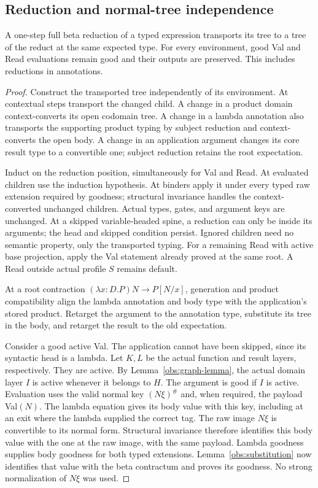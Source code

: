 \subsection{Reduction and normal-tree independence}
\label{obs:reduction}

\begin{lemma}\label{obs:reduction-transport}
A one-step full beta reduction of a typed expression transports its
tree to a tree of the reduct at the same expected type.  For every
environment, good Val and Read evaluations remain good and their
outputs are preserved.  This includes reductions in annotations.
\end{lemma}
\begin{proof}
Construct the transported tree independently of its environment.  At
contextual steps transport the changed child.  A change in a product
domain context-converts its open codomain tree.  A change in a lambda
annotation also transports the supporting product typing by subject
reduction and context-converts the open body.  A change in an
application argument changes its core result type to a convertible
one; subject reduction retains the root expectation.

Induct on the reduction position, simultaneously for Val and Read.
At evaluated children use the induction hypothesis.  At binders apply
it under every typed raw extension required by goodness; structural
invariance handles the context-converted unchanged children.  Actual
types, gates, and argument keys are unchanged.  At a skipped
variable-headed spine, a reduction can only be inside its arguments;
the head and skipped condition persist.  Ignored children need no
semantic property, only the transported typing.  For a remaining Read
with active base projection, apply the Val statement already proved
at the same root.  A Read outside actual profile $S$ remains default.

At a root contraction $(\lambda x:D.P)N\longrightarrow P[N/x]$,
generation and product compatibility align the lambda annotation and
body type with the application's stored product.  Retarget the
argument to the annotation type, substitute its tree in the body, and
retarget the result to the old expectation.

Consider a good active Val.  The application cannot have been skipped,
since its syntactic head is a lambda.  Let $K,L$ be the actual function
and result layers, respectively.  They are active.  By
Lemma~\ref{obs:graph-lemma}, the actual domain layer $I$ is active
whenever it belongs to $H$.  The argument is good if $I$ is active.
Evaluation uses the valid normal key $(N\xi)^\#$ and, when required,
the payload Val$(N)$.  The lambda equation gives its body value with
this key, including at an exit where the lambda supplied the correct
tag.  The raw image $N\xi$ is convertible to its normal form.
Structural invariance therefore identifies this body value with the
one at the raw image, with the same payload.  Lambda goodness supplies
body goodness for both typed extensions.  Lemma~\ref{obs:substitution}
now identifies that value with the beta contractum and proves its
goodness.  No strong normalization of $N\xi$ was used.


\end{proof}
